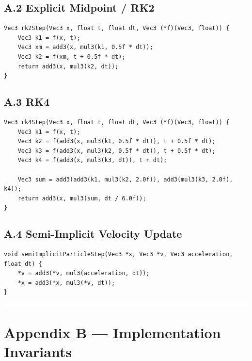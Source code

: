 \documentclass[10pt,letterpaper]{article}
\begin{document}
\subsection*{A.2 Explicit Midpoint / RK2}

\begin{verbatim}
Vec3 rk2Step(Vec3 x, float t, float dt, Vec3 (*f)(Vec3, float)) {
    Vec3 k1 = f(x, t);
    Vec3 xm = add3(x, mul3(k1, 0.5f * dt));
    Vec3 k2 = f(xm, t + 0.5f * dt);
    return add3(x, mul3(k2, dt));
}
\end{verbatim}

\subsection*{A.3 RK4}

\begin{verbatim}
Vec3 rk4Step(Vec3 x, float t, float dt, Vec3 (*f)(Vec3, float)) {
    Vec3 k1 = f(x, t);
    Vec3 k2 = f(add3(x, mul3(k1, 0.5f * dt)), t + 0.5f * dt);
    Vec3 k3 = f(add3(x, mul3(k2, 0.5f * dt)), t + 0.5f * dt);
    Vec3 k4 = f(add3(x, mul3(k3, dt)), t + dt);

    Vec3 sum = add3(add3(k1, mul3(k2, 2.0f)), add3(mul3(k3, 2.0f), k4));
    return add3(x, mul3(sum, dt / 6.0f));
}
\end{verbatim}

\subsection*{A.4 Semi-Implicit Velocity Update}

\begin{verbatim}
void semiImplicitParticleStep(Vec3 *x, Vec3 *v, Vec3 acceleration, float dt) {
    *v = add3(*v, mul3(acceleration, dt));
    *x = add3(*x, mul3(*v, dt));
}
\end{verbatim}

\medskip\hrule\medskip

\clearpage
{}
\section*{Appendix B --- Implementation Invariants}
\end{document}
